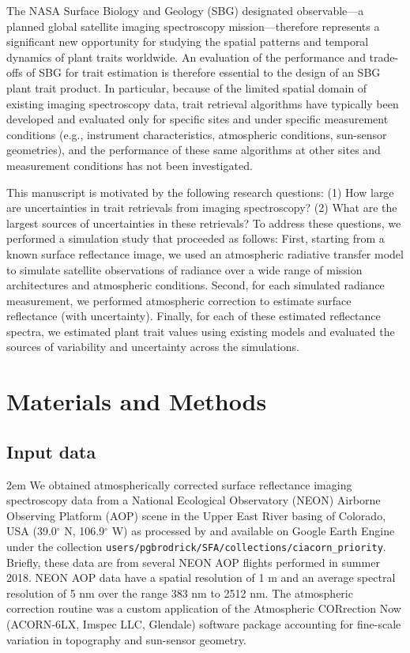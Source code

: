 \documentclass[draft]{agujournal2019}
\begin{document}
The NASA Surface Biology and Geology (SBG) designated observable—a planned global satellite imaging spectroscopy mission—therefore represents a significant new opportunity for studying the spatial patterns and temporal dynamics of plant traits worldwide.
An evaluation of the performance and trade-offs of SBG for trait estimation is therefore essential to the design of an SBG plant trait product.
In particular, because of the limited spatial domain of existing imaging spectroscopy data, trait retrieval algorithms have typically been developed and evaluated only for specific sites and under specific measurement conditions (e.g., instrument characteristics, atmospheric conditions, sun-sensor geometries), and the performance of these same algorithms at other sites and measurement conditions has not been investigated.

This manuscript is motivated by the following research questions:
(1) How large are uncertainties in trait retrievals from imaging spectroscopy?
(2) What are the largest sources of uncertainties in these retrievals?
To address these questions, we performed a simulation study that proceeded as follows:
First, starting from a known surface reflectance image, we used an atmospheric radiative transfer model to simulate satellite observations of radiance over a wide range of mission architectures and atmospheric conditions.
Second, for each simulated radiance measurement, we performed atmospheric correction to estimate surface reflectance (with uncertainty).
Finally, for each of these estimated reflectance spectra, we estimated plant trait values using existing models and evaluated the sources of variability and uncertainty across the simulations.

\section{Materials and Methods}\label{sec:methods}

\subsection{Input data}\label{subsec:input-data}

\emergencystretch 2em  %
We obtained atmospherically corrected surface reflectance imaging spectroscopy data from a National Ecological Observatory (NEON) Airborne Observing Platform (AOP) scene in the Upper East River basing of Colorado, USA (39.0$^{\circ}$ N, 106.9$^{\circ}$ W) as processed by  and available on Google Earth Engine under the collection \texttt{users/pgbrodrick/SFA/collections/ciacorn\_priority}.
Briefly, these data are from several NEON AOP flights performed in summer 2018.
NEON AOP data have a spatial resolution of 1 m and an average spectral resolution of 5 nm over the range 383 nm to 2512 nm.
The atmospheric correction routine was a custom application of the Atmospheric CORrection Now (ACORN‐6LX, Imspec LLC, Glendale) software package accounting for fine-scale variation in topography and sun-sensor geometry.
\end{document}
